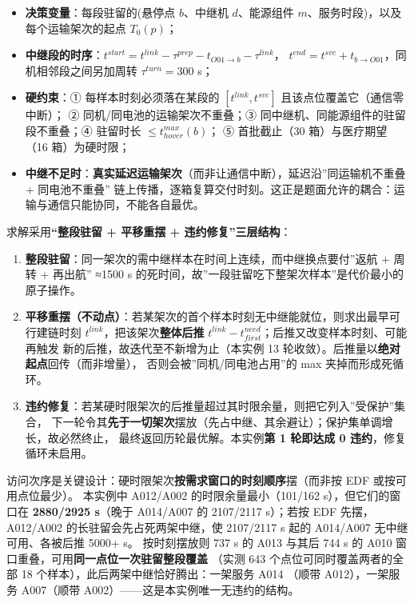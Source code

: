 \documentclass[
  10.5pt,
]{extarticle}
\providecommand{\tightlist}{%
  \setlength{\itemsep}{0pt}\setlength{\parskip}{0pt}}
\begin{document}
\begin{itemize}
\tightlist
\item
  \textbf{决策变量}：每段驻留的(悬停点 \(b\)、中继机 \(d\)、能源组件
  \(m\)、服务时段)，以及每个运输架次的起点 \(T_0(p)\)；
\item
  \textbf{中继段的时序}：\(t^{start}=t^{link}-\tau^{prep}-t_{O01\to b}-\tau^{link}\)，
  \(t^{end}=t^{svc}+t_{b\to O01}\)，同机相邻段之间另加周转
  \(\tau^{turn}=300\) s；
\item
  \textbf{硬约束}：① 每样本时刻必须落在某段的 \([t^{link},t^{svc}]\)
  且该点位覆盖它（通信零中断）； ② 同机/同电池的运输架次不重叠；③
  同中继机、同能源组件的驻留段不重叠；④ 驻留时长
  \(\le t^{max}_{hover}(b)\)； ⑤ 首批截止（30 箱）与医疗期望（16
  箱）为硬时限；
\item
  \textbf{中继不足时}：\textbf{真实延迟运输架次}（而非让通信中断），延迟沿''同运输机不重叠
  + 同电池不重叠''
  链上传播，逐箱复算交付时刻。这正是题面允许的耦合：运输与通信只能协同，不能各自最优。
\end{itemize}

求解采用\textbf{``整段驻留 + 平移重摆 + 违约修复''三层结构}：

\begin{enumerate}
\def\labelenumi{\arabic{enumi}.}
\tightlist
\item
  \textbf{整段驻留}：同一架次的需中继样本在时间上连续，而中继换点要付''返航
  + 周转 + 再出航'' ≈1500 s
  的死时间，故''一段驻留吃下整架次样本''是代价最小的原子操作。
\item
  \textbf{平移重摆（不动点）}：若某架次的首个样本时刻无中继能就位，则求出最早可行建链时刻
  \(t^{link}\)，把该架次\textbf{整体后推}
  \(t^{link}-t^{need}_{first}\)；后推又改变样本时刻、可能再触发
  新的后推，故迭代至不新增为止（本实例 13
  轮收敛）。后推量以\textbf{绝对起点}回传（而非增量），
  否则会被''同机/同电池占用''的 max 夹掉而形成死循环。
\item
  \textbf{违约修复}：若某硬时限架次的后推量超过其时限余量，则把它列入''受保护''集合，
  下一轮令其\textbf{先于一切架次}摆放（先占中继、其余避让）；保护集单调增长，故必然终止，
  最终返回历轮最优解。本实例\textbf{第 1 轮即达成 0
  违约}，修复循环未启用。
\end{enumerate}

访问次序是关键设计：硬时限架次\textbf{按需求窗口的时刻顺序}摆（而非按
EDF 或按可用点位最少）。 本实例中 A012/A002 的时限余量最小（101/162
s），但它们的窗口在 \textbf{2880/2925 s}（晚于 A014/A007 的 2107/2117
s）；若按 EDF 先摆，A012/A002 的长驻留会先占死两架中继，使 2107/2117 s
起的 A014/A007 无中继可用、各被后推 5000+ s。 按时刻摆放则 737 s 的 A013
与其后 744 s 的 A010 窗口重叠，可用\textbf{同一点位一次驻留整段覆盖}
（实测 643 个点位可同时覆盖两者的全部 18
个样本），此后两架中继恰好腾出：一架服务 A014 （顺带 A012），一架服务
A007（顺带 A002）------这是本实例唯一无违约的结构。
\end{document}
